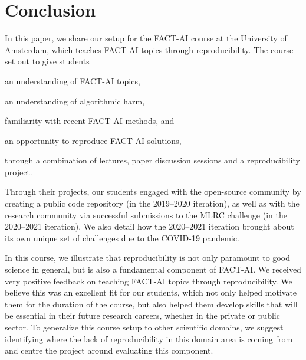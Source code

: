 \documentclass[letterpaper]{article}
\newcommand{\OurUniversity}{the University of Amsterdam}
\begin{document}
\section{Conclusion}
\label{section:conclusion}

In this paper, we share our setup for the FACT-AI course at \OurUniversity{}, which teaches FACT-AI topics through reproducibility.
The course set out to give students
\begin{enumerate*}[label=(\roman*)]
    \item an understanding of FACT-AI topics,
    \item an understanding of algorithmic harm,
    \item familiarity with recent FACT-AI methods, and
    \item an opportunity to reproduce FACT-AI solutions,
\end{enumerate*}
through a combination of lectures, paper discussion sessions and a reproducibility project.

Through their projects, our students engaged with the open-source community by creating a public code repository (in the 2019--2020 iteration), as well as with the research community via successful submissions to the MLRC challenge (in the 2020--2021 iteration).
We also detail how the 2020--2021 iteration brought about its own unique set of challenges due to the COVID-19 pandemic.

In this course, we illustrate that reproducibility is not only paramount to good science in general, but is also a fundamental component of FACT-AI.
We received very positive feedback on teaching FACT-AI topics through reproducibility. We believe this was an excellent fit for our students, which not only helped motivate them for the duration of the course, but also helped them develop skills that will be essential in their future research careers, whether in the private or public sector.
To generalize this course setup to other scientific domains, we suggest identifying where the lack of reproducibility in this domain area is coming from and centre the project around evaluating this component.
\end{document}
